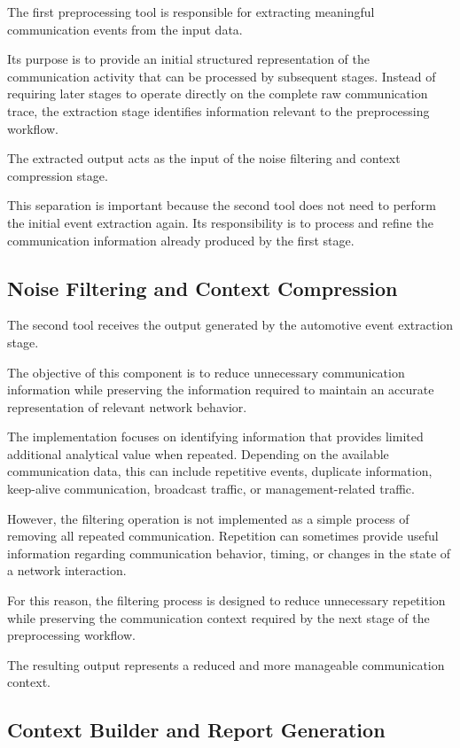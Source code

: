 The first preprocessing tool is responsible for extracting meaningful communication events from the input data.

Its purpose is to provide an initial structured representation of the communication activity that can be processed by subsequent stages. Instead of requiring later stages to operate directly on the complete raw communication trace, the extraction stage identifies information relevant to the preprocessing workflow.

The extracted output acts as the input of the noise filtering and context compression stage.

This separation is important because the second tool does not need to perform the initial event extraction again. Its responsibility is to process and refine the communication information already produced by the first stage.

\subsection{Noise Filtering and Context Compression}

The second tool receives the output generated by the automotive event extraction stage.

The objective of this component is to reduce unnecessary communication information while preserving the information required to maintain an accurate representation of relevant network behavior.

The implementation focuses on identifying information that provides limited additional analytical value when repeated. Depending on the available communication data, this can include repetitive events, duplicate information, keep-alive communication, broadcast traffic, or management-related traffic.

However, the filtering operation is not implemented as a simple process of removing all repeated communication. Repetition can sometimes provide useful information regarding communication behavior, timing, or changes in the state of a network interaction.

For this reason, the filtering process is designed to reduce unnecessary repetition while preserving the communication context required by the next stage of the preprocessing workflow.

The resulting output represents a reduced and more manageable communication context.

\subsection{Context Builder and Report Generation}

